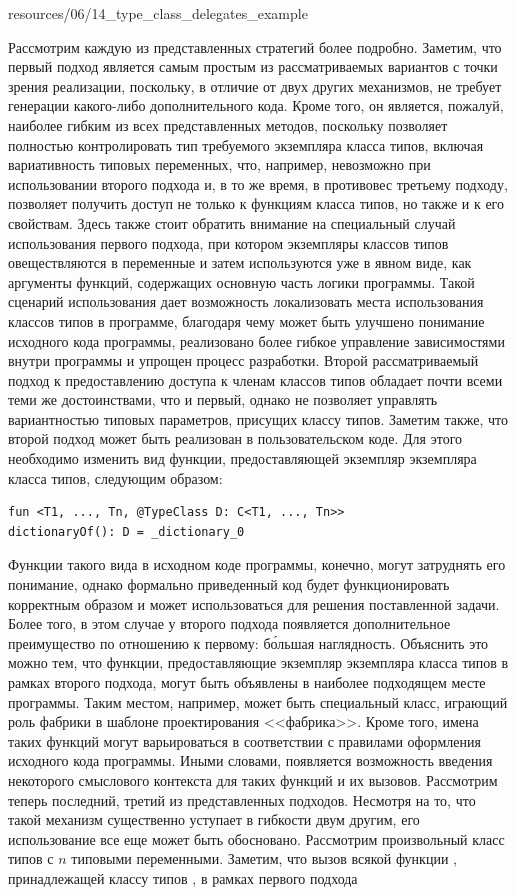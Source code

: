 
{resources/06/14_type_class_delegates_example}

Рассмотрим каждую из представленных стратегий более подробно. Заметим, что первый подход является самым простым из рассматриваемых вариантов с точки зрения реализации, поскольку, в отличие от двух других механизмов, не требует генерации какого-либо дополнительного кода. Кроме того, он является, пожалуй, наиболее гибким из всех представленных методов, поскольку позволяет полностью контролировать тип требуемого экземпляра класса типов, включая вариативность типовых переменных, что, например, невозможно при использовании второго подхода и, в то же время, в противовес третьему подходу, позволяет получить доступ не только к функциям класса типов, но также и к его свойствам. Здесь также стоит обратить внимание на специальный случай использования первого подхода, при котором экземпляры классов типов овеществляются в переменные и затем используются уже в явном виде, как аргументы функций, содержащих основную часть логики программы.  Такой сценарий использования дает возможность локализовать места использования классов типов в программе, благодаря чему может быть улучшено понимание исходного кода программы, реализовано более гибкое управление зависимостями внутри программы и упрощен процесс разработки. Второй рассматриваемый подход к предоставлению доступа к членам классов типов обладает почти всеми теми же достоинствами, что и первый, однако не позволяет управлять вариантностью типовых параметров, присущих классу типов. Заметим также, что второй подход может быть реализован в пользовательском коде. Для этого необходимо изменить вид функции, предоставляющей экземпляр экземпляра класса типов, следующим образом:
\begin{lstlisting}[style={wo_caption}]
fun <T1, ..., Tn, @TypeClass D: C<T1, ..., Tn>> 
dictionaryOf(): D = _dictionary_0
\end{lstlisting}
Функции такого вида в исходном коде программы, конечно, могут затруднять его понимание, однако формально приведенный код будет функционировать корректным образом и может использоваться для решения поставленной задачи. Более того, в этом случае у второго подхода появляется дополнительное преимущество по отношению к первому: б\'{о}льшая наглядность. Объяснить это можно тем, что функции, предоставляющие экземпляр экземпляра класса типов в рамках второго подхода, могут быть объявлены в наиболее подходящем месте программы. Таким местом, например, может быть специальный класс, играющий роль фабрики в шаблоне проектирования <<фабрика>>. Кроме того, имена таких функций могут варьироваться в соответствии с правилами оформления исходного кода программы. Иными словами, появляется возможность введения некоторого смыслового контекста для таких функций и их вызовов. Рассмотрим теперь последний, третий из представленных подходов. Несмотря на то, что такой механизм существенно уступает в гибкости двум другим, его использование все еще может быть обосновано. Рассмотрим произвольный класс типов  с $n$ типовыми переменными. Заметим, что вызов всякой функции , принадлежащей классу типов , в рамках первого подхода
